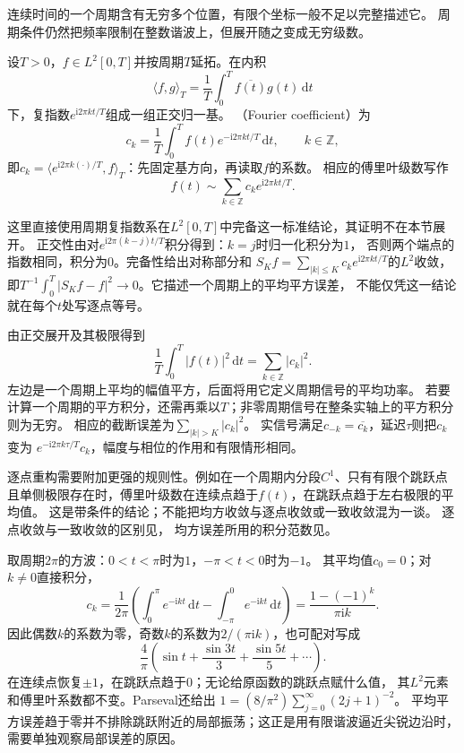 连续时间的一个周期含有无穷多个位置，有限个坐标一般不足以完整描述它。
周期条件仍然把频率限制在整数谐波上，但展开随之变成无穷级数。
\begin{definition}[周期信号的傅里叶系数与级数]
  \label{def:signal-analysis-fourier-series}
  设$T>0$，$f\in L^2[0,T]$并按周期$T$延拓。在内积
  \[
    \langle f,g\rangle_T=\frac1T\int_0^T \overline{f(t)}g(t)\,\mathrm dt
  \]
  下，复指数$e^{\mathrm i2\pi kt/T}$组成一组正交归一基。
  （Fourier coefficient）为
  \[
    c_k=\frac1T\int_0^T f(t)e^{-\mathrm i2\pi kt/T}\,\mathrm dt,
    \qquad k\in\mathbb Z,
  \]
  即$c_k=\langle e^{\mathrm i2\pi k(\cdot)/T},f\rangle_T$：先固定基方向，再读取$f$的系数。
  相应的傅里叶级数写作
  \begin{equation}
    f(t)\sim\sum_{k\in\mathbb Z}c_ke^{\mathrm i2\pi kt/T}.
    \label{eq:signal-analysis-fourier-series}
  \end{equation}
\end{definition}
这里直接使用周期复指数系在$L^2[0,T]$中完备这一标准结论，其证明不在本节展开。
正交性由对$e^{\mathrm i2\pi(k-j)t/T}$积分得到：$k=j$时归一化积分为$1$，
否则两个端点的指数相同，积分为$0$。完备性给出对称部分和
$S_Kf=\sum_{|k|\leq K}c_ke^{\mathrm i2\pi kt/T}$的$L^2$收敛，
即$T^{-1}\int_0^T|S_Kf-f|^2\to0$。它描述一个周期上的平均平方误差，
不能仅凭这一结论就在每个$t$处写逐点等号。

由正交展开及其极限得到
\begin{equation}
  \frac1T\int_0^T|f(t)|^2\,\mathrm dt
  =\sum_{k\in\mathbb Z}|c_k|^2.
  \label{eq:signal-analysis-continuous-parseval}
\end{equation}
左边是一个周期上平均的幅值平方，后面将用它定义周期信号的平均功率。
若要计算一个周期的平方积分，还需再乘以$T$；非零周期信号在整条实轴上的平方积分则为无穷。
相应的截断误差为$\sum_{|k|>K}|c_k|^2$。
实信号满足$c_{-k}=\overline{c_k}$，延迟$\tau$则把$c_k$变为
$e^{-\mathrm i2\pi k\tau/T}c_k$，幅度与相位的作用和有限情形相同。

逐点重构需要附加更强的规则性。例如在一个周期内分段$C^1$、只有有限个跳跃点
且单侧极限存在时，傅里叶级数在连续点趋于$f(t)$，在跳跃点趋于左右极限的平均值。
这是带条件的结论；不能把均方收敛与逐点收敛或一致收敛混为一谈。
逐点收敛与一致收敛的区别见，
均方误差所用的积分范数见。

取周期$2\pi$的方波：$0<t<\pi$时为$1$，$-\pi<t<0$时为$-1$。
其平均值$c_0=0$；对$k\neq0$直接积分，
\[
  c_k=\frac1{2\pi}\left(
    \int_0^\pi e^{-\mathrm ikt}\,\mathrm dt
    -\int_{-\pi}^0 e^{-\mathrm ikt}\,\mathrm dt\right)
  =\frac{1-(-1)^k}{\pi\mathrm ik}.
\]
因此偶数$k$的系数为零，奇数$k$的系数为$2/(\pi\mathrm ik)$，也可配对写成
\[
  \frac4\pi\left(\sin t+\frac{\sin3t}{3}+\frac{\sin5t}{5}+\cdots\right).
\]
在连续点恢复$\pm1$，在跳跃点趋于$0$；无论给原函数的跳跃点赋什么值，
其$L^2$元素和傅里叶系数都不变。Parseval还给出
$1=(8/\pi^2)\sum_{j=0}^{\infty}(2j+1)^{-2}$。
平均平方误差趋于零并不排除跳跃附近的局部振荡；这正是用有限谐波逼近尖锐边沿时，
需要单独观察局部误差的原因。

